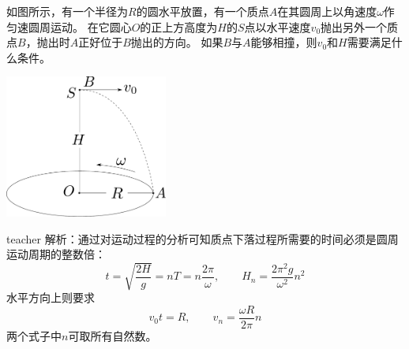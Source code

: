 \begin{example}
如图所示，有一个半径为$R$的圆水平放置，有一个质点$A$在其圆周上以角速度$\omega$作匀速圆周运动。
在它圆心$O$的正上方高度为$H$的$S$点以水平速度$v_0$抛出另外一个质点$B$，抛出时$A$正好位于$B$抛出的方向。
如果$B$与$A$能够相撞，则$v_0$和$H$需要满足什么条件。
\begin{flushright}
\includegraphics[width = 0.4\textwidth]{images/motion-16.pdf} 
\end{flushright}
\begin{taggedblock}{teacher}
\noindent
解析：通过对运动过程的分析可知质点下落过程所需要的时间必须是圆周运动周期的整数倍：
\[
t = \sqrt{\frac{2H}{g}} = nT = n\frac{2\pi}{\omega},\qquad H_n  = \frac{2\pi^2 g}{\omega^2}n^2
\]
水平方向上则要求
\[v_0t = R,\qquad v_n = \frac{\omega R}{2\pi} n\]
两个式子中$n$可取所有自然数。
\end{taggedblock}
\end{example}

